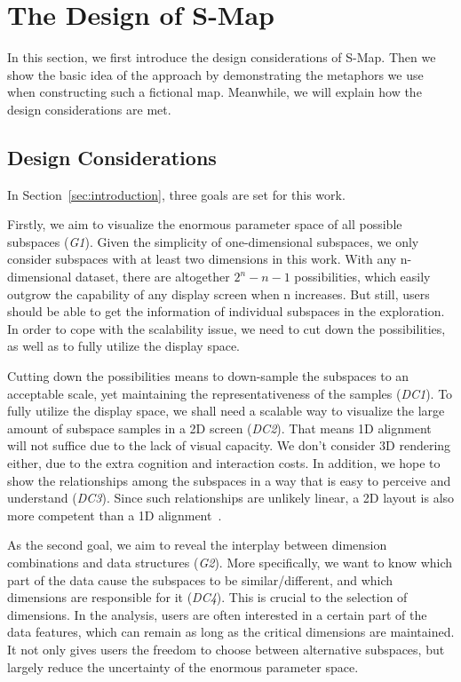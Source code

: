 \section{The Design of S-Map}
In this section, we first introduce the design considerations of S-Map. Then we show the basic idea of the approach by demonstrating the metaphors we use when constructing such a fictional map. Meanwhile, we will explain how the design considerations are met.

\subsection{Design Considerations}
In Section~\ref{sec:introduction}, three goals are set for this work. 

Firstly, we aim to visualize the enormous parameter space of all possible subspaces (\textit{G1}). Given the simplicity of one-dimensional subspaces, we only consider subspaces with at least two dimensions in this work. With any n-dimensional dataset, there are altogether $2^n - n - 1$ possibilities, which easily outgrow the capability of any display screen when n increases. But still, users should be able to get the information of individual subspaces in the exploration. In order to cope with the scalability issue, we need to cut down the possibilities, as well as to fully utilize the display space.

Cutting down the possibilities means to down-sample the subspaces to an acceptable scale, yet maintaining the representativeness of the samples (\textit{DC1}). To fully utilize the display space, we shall need a scalable way to visualize the large amount of subspace samples in a 2D screen (\textit{DC2}). That means 1D alignment~\cite{jackle2017pattern} will not suffice due to the lack of visual capacity. We don't consider 3D rendering either, due to the extra cognition and interaction costs. In addition, we hope to show the relationships among the subspaces in a way that is easy to perceive and understand (\textit{DC3}). Since such relationships are unlikely linear, a 2D layout is also more competent than a 1D alignment~\cite{jackle2017pattern}.

As the second goal, we aim to reveal the interplay between dimension combinations and data structures (\textit{G2}). More specifically, we want to know which part of the data cause the subspaces to be similar/different, and which dimensions are responsible for it (\textit{DC4}). This is crucial to the selection of dimensions. In the analysis, users are often interested in a certain part of the data features, which can remain as long as the critical dimensions are maintained. It not only gives users the freedom to choose between alternative subspaces, but largely reduce the uncertainty of the enormous parameter space.

